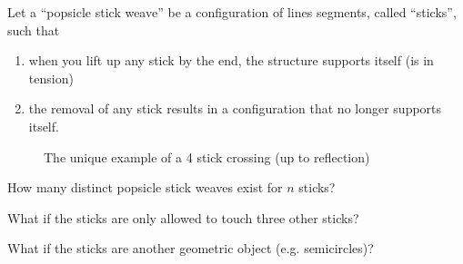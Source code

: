 \documentclass{article}
\begin{document}
  Let a ``popsicle stick weave'' be a configuration of lines segments, called ``sticks'', such that
  \begin{enumerate}[(1)]
    \item when you lift up any stick by the end, the structure supports itself (is in tension)
    \item the removal of any stick results in a configuration that no longer supports itself.
  \end{enumerate}

\begin{figure}[!h]
  \centering
  \caption{The unique example of a 4 stick crossing (up to reflection)}
\end{figure}

\begin{question}
  How many distinct popsicle stick weaves exist for $n$ sticks?
\end{question}

\begin{related}
  \item What if the sticks are only allowed to touch three other sticks?
  \item What if the sticks are another geometric object (e.g. semicircles)?
\end{related}
\end{document}

